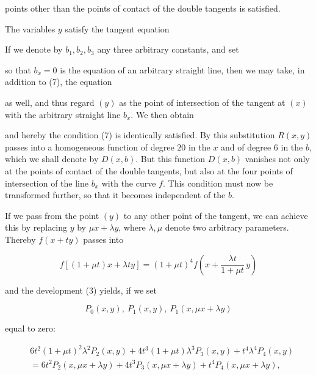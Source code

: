 points other than the points of contact of the double tangents
is satisfied.

The variables $y$ satisfy the tangent equation


If we denote by $b_1, b_2, b_3$ any three arbitrary constants, and set


so that $b_x = 0$ is the equation of an arbitrary straight line, then we may take, in addition to (7), the equation


as well, and thus regard $(y)$ as the point of intersection of the tangent at $(x)$ with the arbitrary straight line $b_x$. We then obtain


and hereby the condition (7) is identically satisfied. By this substitution $R(x,y)$ passes into a homogeneous function of degree $20$ in the $x$ and of degree $6$ in the $b$, which we shall denote by $D(x,b)$. But this function $D(x,b)$ vanishes not only at the points of contact of the double tangents, but also at the four points of intersection of the line $b_x$ with the curve $f$. This condition must now be transformed further, so that it becomes independent of the $b$.

If we pass from the point $(y)$ to any other point of the tangent, we can achieve this by replacing $y$ by $\mu x + \lambda y$, where $\lambda, \mu$ denote two arbitrary parameters. Thereby $f(x+ty)$ passes into

\[
f[(1+\mu t)x + \lambda t y] = (1+\mu t)^4 f\left(x + \frac{\lambda t}{1+\mu t}\, y\right)
\]

and the development (3) yields, if we set

\[
P_0(x,y),\ P_1(x,y),\ P_1(x,\mu x + \lambda y)
\]

equal to zero:

\[
\begin{aligned}
&6t^2(1+\mu t)^2\lambda^2 P_2(x,y) + 4t^3(1+\mu t)\lambda^3 P_3(x,y) + t^4\lambda^4 P_4(x,y)\\
&= 6t^2 P_2(x,\mu x + \lambda y) + 4t^3 P_3(x,\mu x + \lambda y) + t^4 P_4(x,\mu x + \lambda y),
\end{aligned}
\]
